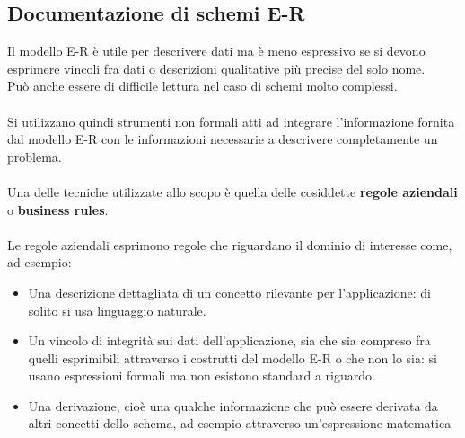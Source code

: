 \documentclass[../main.tex]{subfiles}
\begin{document}
	\subsection{Documentazione di schemi E-R}
	Il modello E-R è utile per descrivere dati ma è meno espressivo se si devono esprimere vincoli fra dati o descrizioni qualitative più precise del solo nome. \\
	Può anche essere di difficile lettura nel caso di schemi molto complessi.\\\\
	Si utilizzano quindi strumenti non formali atti ad integrare l’informazione fornita dal modello E-R con le informazioni necessarie a descrivere completamente un problema.\\\\
	Una delle tecniche utilizzate allo scopo è quella delle cosiddette \textbf{regole aziendali} o \textbf{business rules}.\\\\
	Le regole aziendali esprimono regole che riguardano il dominio di interesse come, ad esempio:
	\begin{itemize}
		\item Una descrizione dettagliata di un concetto rilevante per l’applicazione: di solito si usa linguaggio naturale.
		\item Un vincolo di integrità sui dati dell’applicazione, sia che sia compreso fra quelli esprimibili attraverso i costrutti del modello E-R o che non lo sia: si usano espressioni formali ma non esistono standard a riguardo.
		\item Una derivazione, cioè una qualche informazione che può essere derivata da altri concetti dello schema, ad esempio attraverso un’espressione matematica
	\end{itemize}
\end{document}

